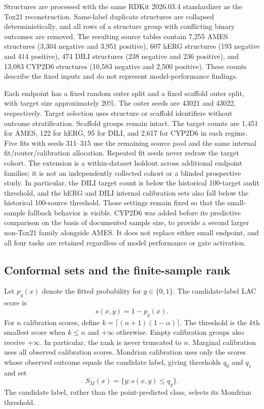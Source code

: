 \documentclass[11pt]{article}
\begin{document}
Structures are processed with the same RDKit 2026.03.4 standardizer as the Tox21 reconstruction. Same-label duplicate structures are collapsed deterministically, and all rows of a structure group with conflicting binary outcomes are removed. The resulting source tables contain 7,255 AMES structures (3,304 negative and 3,951 positive), 607 hERG structures (193 negative and 414 positive), 474 DILI structures (238 negative and 236 positive), and 13,083 CYP2D6 structures (10,583 negative and 2,500 positive). These counts describe the fixed inputs and do not represent model-performance findings.

Each endpoint has a fixed random outer split and a fixed scaffold outer split, with target size approximately 20\%. The outer seeds are 43021 and 43022, respectively. Target selection uses structure or scaffold identifiers without outcome stratification. Scaffold groups remain intact. The target counts are 1,451 for AMES, 122 for hERG, 95 for DILI, and 2,617 for CYP2D6 in each regime. Five fits with seeds 311--315 use the remaining source pool and the same internal fit/router/calibration allocation. Repeated fit seeds never redraw the target cohort. The extension is a within-dataset holdout across additional endpoint families; it is not an independently collected cohort or a blinded prospective study. In particular, the DILI target count is below the historical 100-target audit threshold, and the hERG and DILI internal calibration sets also fall below the historical 100-source threshold. Those settings remain fixed so that the small-sample fallback behavior is visible. CYP2D6 was added before its predictive comparison on the basis of documented sample size, to provide a second larger non-Tox21 family alongside AMES. It does not replace either small endpoint, and all four tasks are retained regardless of model performance or gate activation.

\subsection{Conformal sets and the finite-sample rank}
Let $p_y(x)$ denote the fitted probability for $y\in\{0,1\}$. The candidate-label LAC score is
\begin{equation}
 s(x,y)=1-p_y(x).
\end{equation}
For $n$ calibration scores, define $k=\lceil(n+1)(1-\alpha)\rceil$. The threshold is the $k$th smallest score when $k\leq n$ and $+\infty$ otherwise. Empty calibration groups also receive $+\infty$. In particular, the rank is never truncated to $n$. Marginal calibration uses all observed calibration scores. Mondrian calibration uses only the scores whose observed outcome equals the candidate label, giving thresholds $q_0$ and $q_1$ and set
\begin{equation}
 S_M(x)=\{y:s(x,y)\leq q_y\}.
\end{equation}
The candidate label, rather than the point-predicted class, selects its Mondrian threshold.
\end{document}
